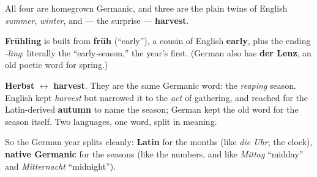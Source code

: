 All four are homegrown Germanic, and three are the plain twins of English
\emph{summer}, \emph{winter}, and --- the surprise --- \textbf{harvest}.

\begin{morphologybox}
\textbf{Fr\"{u}hling} is built from \textbf{fr\"{u}h} (``early''), a cousin of
English \textbf{early}, plus the ending \emph{-ling}: literally the
``early-season,'' the year's first. (German also has \textbf{der Lenz}, an old
poetic word for spring.)
\end{morphologybox}

\begin{cousinweb}
\textbf{Herbst} $\leftrightarrow$ \textbf{harvest}. They are the same Germanic
word: the \emph{reaping} season. English kept \emph{harvest} but narrowed it to
the \emph{act} of gathering, and reached for the Latin-derived \textbf{autumn}
to name the season; German kept the old word for the season itself. Two
languages, one word, split in meaning.
\end{cousinweb}

\begin{culture}
So the German year splits cleanly: \textbf{Latin} for the months (like
\emph{die Uhr}, the clock), \textbf{native Germanic} for the seasons (like the
numbers, and like \emph{Mittag} ``midday'' and \emph{Mitternacht}
``midnight'').
\end{culture}
